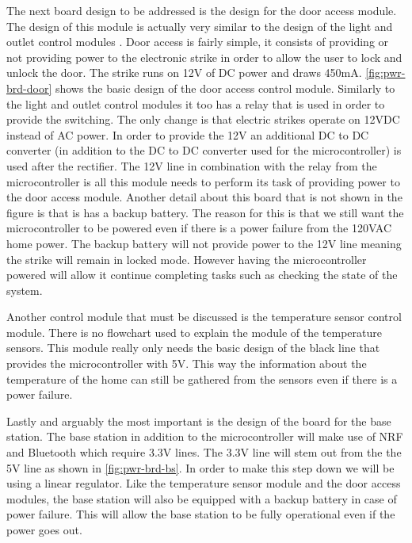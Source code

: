
The next board design to be addressed is the design for the door
access module. The design of this module is actually very similar to the
design of the light and outlet control modules . Door access is fairly
simple, it consists of providing or not providing power to the electronic
strike in order to allow the user to lock and unlock the door. The strike
runs on 12V of DC power and draws 450mA. \autoref{fig:pwr-brd-door} shows the
basic design of the door access control module. Similarly to the light and
outlet control modules it too has a relay that is used in order to provide
the switching. The only change is that electric strikes operate on 12VDC
instead of AC power. In order to provide the 12V an additional DC to DC
converter (in addition to the DC to DC converter used for the
microcontroller) is used after the rectifier. The 12V line in combination
with the relay from the microcontroller is all this module needs to perform
its task of providing power to the door access module. Another detail about
this board that is not shown in the figure is that is has a backup battery.
The reason for this is that we still want the microcontroller to be powered
even if there is a power failure from the 120VAC home power. The backup
battery will not provide power to the 12V line meaning the strike will remain
in locked mode. However having the microcontroller powered will allow it
continue completing tasks such as checking the state of the system.


Another control module that must be discussed is the temperature
sensor control module. There is no flowchart used to explain the module of
the temperature sensors. This module really only needs the basic design of
the black line that provides the microcontroller with 5V. This way the
information about the temperature of the home can still be gathered from the
sensors even if there is a power failure.

Lastly and arguably the most important is the design of the
board for the base station. The base station in addition to the
microcontroller will make use of NRF and Bluetooth which require 3.3V lines.
The 3.3V line will stem out from the the 5V line as shown in
\autoref{fig:pwr-brd-bs}. In order to make this step down we will be
using a linear regulator.  Like the temperature sensor module and the door
access modules, the base station will also be equipped with a backup battery in
case of power failure. This will allow the base station to be fully operational
even if the power goes out.

